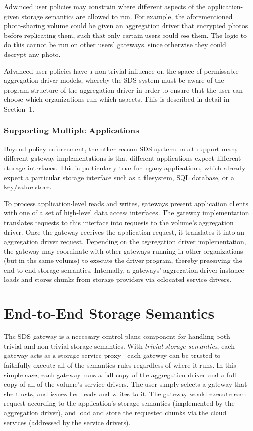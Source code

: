 Advanced user policies may constrain where different aspects of the
application-given storage semantics are allowed to run.  For example, the
aforementioned photo-sharing volume could be given an aggregation driver that
encrypted photos before replicating them, such that only certain users could see
them.  The logic to do this cannot be run on other users' gateways, since
otherwise they could decrypt any photo.

Advanced user policies have a non-trivial influence on the space of
permissable aggregation driver models, whereby the SDS system must
be aware of the program structure of the aggregation driver in order to ensure
that the user can choose which organizations run which aspects.  This is
described in detail in Section~\ref{sec:aggregation-driver-model}.

\subsubsection{Supporting Multiple Applications}

Beyond policy enforcement, the other reason SDS systems must support many different
gateway implementations is that different applications expect different storage
interfaces.  This is particularly true for legacy applications, which already
expect a particular storage interface such as a filesystem, SQL database, or a
key/value store.

To process application-level reads and writes, gateways present
application clients with one of a set of high-level data access
interfaces.  The gateway implementation translates requests to this interface
into requests to the volume's aggregation driver.
Once the gateway receives the application request, it translates
it into an aggregation driver request.  Depending on the aggregation
driver implementation, the gateway may coordinate with other
gateways running in other organizations (but in the same volume) to
execute the driver program, thereby preserving the end-to-end storage semantics.
Internally, a gateways' aggregation driver instance loads and stores chunks from
storage providers via colocated service drivers.

\section{End-to-End Storage Semantics}
\label{sec:aggregation-driver-model}

The SDS gateway is a necessary control plane component for handling both trivial and non-trivial
storage semantics.  With \emph{trivial storage semantics}, each gateway acts as a
storage service proxy---each gateway can be trusted
to faithfully execute all of the semantics rules regardless of where it runs.
In this simple case, each gateway runs a full copy of the aggregation driver
and a full copy of all of the volume's service drivers.  The user
simply selects a gateway that she trusts, and issues her reads and writes to it.
The gateway would execute each request according to the application's storage semantics
(implemented by the aggregation driver), and load and store the requested chunks
via the cloud services (addressed by the service drivers).

